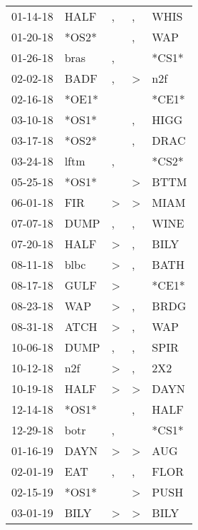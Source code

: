 \begin{supertabular}{lllll}
 01-14-18 &   HALF &             , &             , &   WHIS \\
 01-20-18 &  *OS2* &               &             , &    WAP \\
 01-26-18 &   bras &             , &               &  *CS1* \\
 02-02-18 &   BADF &             , &  \textgreater &    n2f \\
 02-16-18 &  *OE1* &               &               &  *CE1* \\
 03-10-18 &  *OS1* &               &             , &   HIGG \\
 03-17-18 &  *OS2* &               &             , &   DRAC \\
 03-24-18 &   lftm &             , &               &  *CS2* \\
 05-25-18 &  *OS1* &               &  \textgreater &   BTTM \\
 06-01-18 &    FIR &  \textgreater &  \textgreater &   MIAM \\
 07-07-18 &   DUMP &             , &             , &   WINE \\
 07-20-18 &   HALF &  \textgreater &             , &   BILY \\
 08-11-18 &   blbc &  \textgreater &             , &   BATH \\
 08-17-18 &   GULF &  \textgreater &               &  *CE1* \\
 08-23-18 &    WAP &  \textgreater &             , &   BRDG \\
 08-31-18 &   ATCH &  \textgreater &             , &    WAP \\
 10-06-18 &   DUMP &             , &             , &   SPIR \\
 10-12-18 &    n2f &  \textgreater &             , &    2X2 \\
 10-19-18 &   HALF &  \textgreater &  \textgreater &   DAYN \\
 12-14-18 &  *OS1* &               &             , &   HALF \\
 12-29-18 &   botr &             , &               &  *CS1* \\
 01-16-19 &   DAYN &  \textgreater &  \textgreater &    AUG \\
 02-01-19 &    EAT &             , &             , &   FLOR \\
 02-15-19 &  *OS1* &               &  \textgreater &   PUSH \\
 03-01-19 &   BILY &  \textgreater &  \textgreater &   BILY \\

\end{supertabular}
